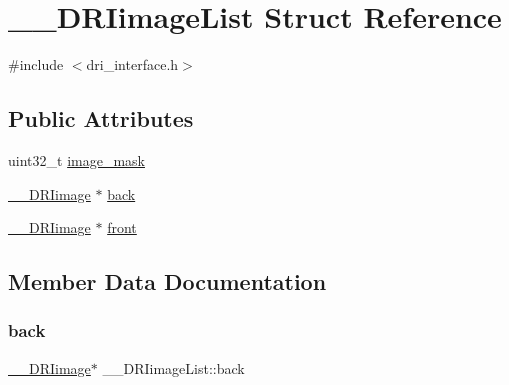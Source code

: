 \hypertarget{struct_____d_r_iimage_list}{}\section{\+\_\+\+\_\+\+D\+R\+Iimage\+List Struct Reference}
\label{struct_____d_r_iimage_list}


{\ttfamily \#include $<$dri\+\_\+interface.\+h$>$}

\subsection*{Public Attributes}
\begin{DoxyCompactItemize}
\item 
uint32\+\_\+t \hyperlink{struct_____d_r_iimage_list_aee02d39c3dc5a4c015e8f3a6af9d17b3}{image\+\_\+mask}
\item 
\hyperlink{dri__interface_8h_a37e0407153595dc88fe5d25127645cf1}{\+\_\+\+\_\+\+D\+R\+Iimage} $\ast$ \hyperlink{struct_____d_r_iimage_list_a146bc59debdf13042180d3fe15ee4c70}{back}
\item 
\hyperlink{dri__interface_8h_a37e0407153595dc88fe5d25127645cf1}{\+\_\+\+\_\+\+D\+R\+Iimage} $\ast$ \hyperlink{struct_____d_r_iimage_list_a1242ec40e9a0a0b88193ab650ee9858b}{front}
\end{DoxyCompactItemize}


\subsection{Member Data Documentation}
\mbox{\label{struct_____d_r_iimage_list_a146bc59debdf13042180d3fe15ee4c70}} 
\subsubsection{\texorpdfstring{back}{back}}
{\footnotesize\ttfamily \hyperlink{dri__interface_8h_a37e0407153595dc88fe5d25127645cf1}{\+\_\+\+\_\+\+D\+R\+Iimage}$\ast$ \+\_\+\+\_\+\+D\+R\+Iimage\+List\+::back}

\mbox{\label{struct_____d_r_iimage_list_a1242ec40e9a0a0b88193ab650ee9858b}} 
